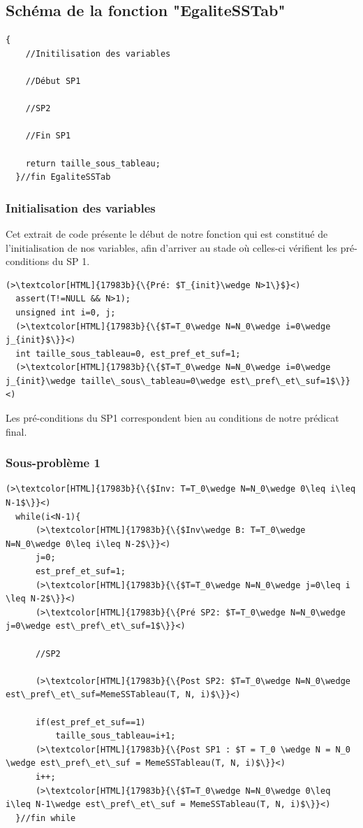 \documentclass[a4paper, 11pt, oneside]{article}
\begin{document}
\subsection{Schéma de la fonction "EgaliteSSTab"}
\begin{lstlisting}[caption={Schéma de la fonction "EgaliteSSTab"}]
  {
    //Initilisation des variables

    //Début SP1

    //SP2

    //Fin SP1

    return taille_sous_tableau;
  }//fin EgaliteSSTab
\end{lstlisting}

\subsubsection{Initialisation des variables}
Cet extrait de code présente le début de notre fonction qui est constitué 
de l'initialisation de nos variables, afin d'arriver au stade où celles-ci vérifient les pré-conditions du SP 1.
\begin{lstlisting}[caption={Initialisation des variables}]
  (>\textcolor[HTML]{17983b}{\{Pré: $T_{init}\wedge N>1\}$}<)
  assert(T!=NULL && N>1);
  unsigned int i=0, j;
  (>\textcolor[HTML]{17983b}{\{$T=T_0\wedge N=N_0\wedge i=0\wedge j_{init}$\}}<)
  int taille_sous_tableau=0, est_pref_et_suf=1;
  (>\textcolor[HTML]{17983b}{\{$T=T_0\wedge N=N_0\wedge i=0\wedge j_{init}\wedge taille\_sous\_tableau=0\wedge est\_pref\_et\_suf=1$\}}<)
\end{lstlisting}
Les pré-conditions du SP1 correspondent bien au conditions de notre prédicat final.

\subsubsection{Sous-problème 1}
\begin{lstlisting}[caption={Sous-problème 1}]
  (>\textcolor[HTML]{17983b}{\{$Inv: T=T_0\wedge N=N_0\wedge 0\leq i\leq N-1$\}}<)
  while(i<N-1){
      (>\textcolor[HTML]{17983b}{\{$Inv\wedge B: T=T_0\wedge N=N_0\wedge 0\leq i\leq N-2$\}}<)
      j=0;
      est_pref_et_suf=1;
      (>\textcolor[HTML]{17983b}{\{$T=T_0\wedge N=N_0\wedge j=0\leq i \leq N-2$\}}<)
      (>\textcolor[HTML]{17983b}{\{Pré SP2: $T=T_0\wedge N=N_0\wedge j=0\wedge est\_pref\_et\_suf=1$\}}<)

      //SP2

      (>\textcolor[HTML]{17983b}{\{Post SP2: $T=T_0\wedge N=N_0\wedge est\_pref\_et\_suf=MemeSSTableau(T, N, i)$\}}<)

      if(est_pref_et_suf==1)
          taille_sous_tableau=i+1;
      (>\textcolor[HTML]{17983b}{\{Post SP1 : $T = T_0 \wedge N = N_0 \wedge est\_pref\_et\_suf = MemeSSTableau(T, N, i)$\}}<)
      i++;
      (>\textcolor[HTML]{17983b}{\{$T=T_0\wedge N=N_0\wedge 0\leq i\leq N-1\wedge est\_pref\_et\_suf = MemeSSTableau(T, N, i)$\}}<)
  }//fin while
\end{lstlisting}
\end{document}
